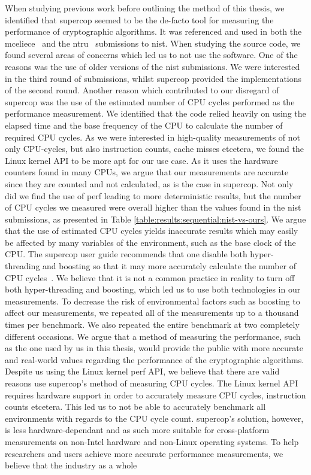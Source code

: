 When studying previous work before outlining the method of this thesis, we identified that \gls{supercop} seemed to be the de-facto tool for measuring the performance of cryptographic algorithms. It was referenced and used in both the \gls{mceliece}~\cite{mceliece2020} and the \gls{ntru}~\cite{ntru2020} submissions to \gls{nist}. When studying the source code, we found several areas of concerns which led us to not use the software. One of the reasons was the use of older versions of the \gls{nist} submissions. We were interested in the third round of submissions, whilst \gls{supercop} provided the implementations of the second round. Another reason which contributed to our disregard of \gls{supercop} was the use of the estimated number of CPU cycles performed as the performance measurement. We identified that the code relied heavily on using the elapsed time and the base frequency of the CPU to calculate the number of required CPU cycles. As we were interested in high-quality measurements of not only CPU-cycles, but also instruction counts, cache misses etcetera, we found the Linux kernel API to be more apt for our use case. As it uses the hardware counters found in many CPUs, we argue that our measurements are accurate since they are counted and not calculated, as is the case in \gls{supercop}. Not only did we find the use of perf leading to more deterministic results, but the number of CPU cycles we measured were overall higher than the values found in the \gls{nist} submissions, as presented in Table \ref{table:results:sequential:nist-vs-ours}. We argue that the use of estimated CPU cycles yields inaccurate results which may easily be affected by many variables of the environment, such as the base clock of the CPU. The \gls{supercop} user guide recommends that one disable both hyper-threading and boosting so that it may more accurately calculate the number of CPU cycles~\cite{supercop}. We believe that it is not a common practice in reality to turn off both hyper-threading and boosting, which led us to use both technologies in our measurements. To decrease the risk of environmental factors such as boosting to affect our measurements, we repeated all of the measurements up to a thousand times per benchmark. We also repeated the entire benchmark at two completely different occasions. We argue that a method of measuring the performance, such as the one used by us in this thesis, would provide the public with more accurate and real-world values regarding the performance of the cryptographic algorithms. Despite us using the Linux kernel perf API, we believe that there are valid reasons use \gls{supercop}'s method of measuring CPU cycles. The Linux kernel API requires hardware support in order to accurately measure CPU cycles, instruction counts etcetera. This led us to not be able to accurately benchmark all environments with regards to the CPU cycle count. \gls{supercop}'s solution, however, is less hardware-dependant and as such more suitable for cross-platform measurements on non-Intel hardware and non-Linux operating systems. To help researchers and users achieve more accurate performance measurements, we believe that the industry as a whole 